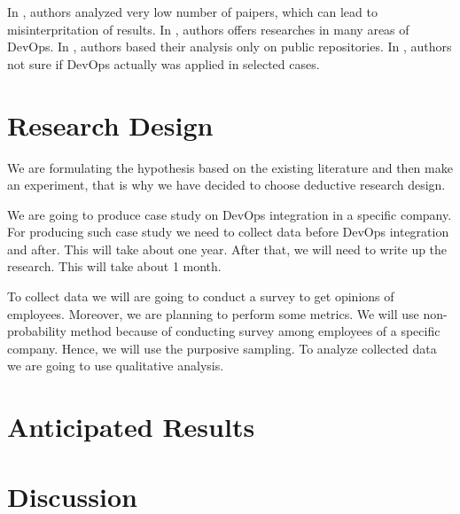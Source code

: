 \documentclass[oneside,final,12pt,a4paper]{extreport}
\begin{document}
In \cite{8}, authors analyzed very low number of paipers, which can lead to misinterpritation of results. In \cite{11}, authors offers researches in many areas of DevOps. In \cite{20}, authors based their analysis only on public repositories. In \cite{21}, authors not sure if DevOps actually was applied in selected cases.

\section{Research Design}

We are formulating the hypothesis based on the existing literature and then make an experiment, that is why we have decided to choose deductive research design.

We are going to produce case study on DevOps integration in a specific company. For producing such case study we need to collect data before DevOps integration and after. This will take about one year. After that, we will need to write up the research. This will take about 1 month.

To collect data we will are going to conduct a survey to get opinions of employees. Moreover, we are planning to perform some metrics. We will use non-probability method because of conducting survey among employees of a specific company. Hence, we will use the purposive sampling. To analyze collected data we are going to use qualitative analysis.

\section{Anticipated Results}



\section{Discussion}



\newpage
\printbibliography[heading=bibintoc,title={References}]
\end{document}
